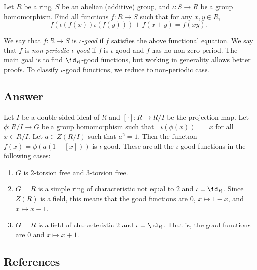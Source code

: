 Let $R$ be a ring, $S$ be an abelian (additive) group, and $\iota : S \to R$ be a group homomorphism.
Find all functions $f : R \to S$ such that for any $x, y \in R$,
\[ f(\iota(f(x)) \iota(f(y))) + f(x + y) = f(xy). \tag{*}\label{2017a6-eq0} \]

We say that $f : R \to S$ is \emph{$\iota$-good} if $f$ satisfies the above functional equation.
We say that $f$ is \emph{non-periodic $\iota$-good} if $f$ is $\iota$-good and $f$ has no non-zero period.
The main goal is to find $\id_R$-good functions, but working in generality allows better proofs.
To classify $\iota$-good functions, we reduce to non-periodic case.





\subsection*{Answer}

Let $I$ be a double-sided ideal of $R$ and $[\cdot] : R \to R/I$ be the projection map.
Let $\phi : R/I \to G$ be a group homomorphism such that $[\iota(\phi(x))] = x$ for all $x \in R/I$.
Let $a \in Z(R/I)$ such that $a^2 = 1$.
Then the function $f(x) = \phi(a(1 - [x]))$ is $\iota$-good.
These are all the $\iota$-good functions in the following cases:
\begin{enumerate}

    \item 
    $G$ is $2$-torsion free and $3$-torsion free.
    
    \item
    $G = R$ is a simple ring of characteristic not equal to $2$ and $\iota = \id_R$.
    Since $Z(R)$ is a field, this means that the good functions are $0$, $x \mapsto 1 - x$, and $x \mapsto x - 1$.
    
    \item
    $G = R$ is a field of characteristic $2$ and $\iota = \id_R$.
    That is, the good functions are $0$ and $x \mapsto x + 1$.

\end{enumerate}





\subsection*{References}

